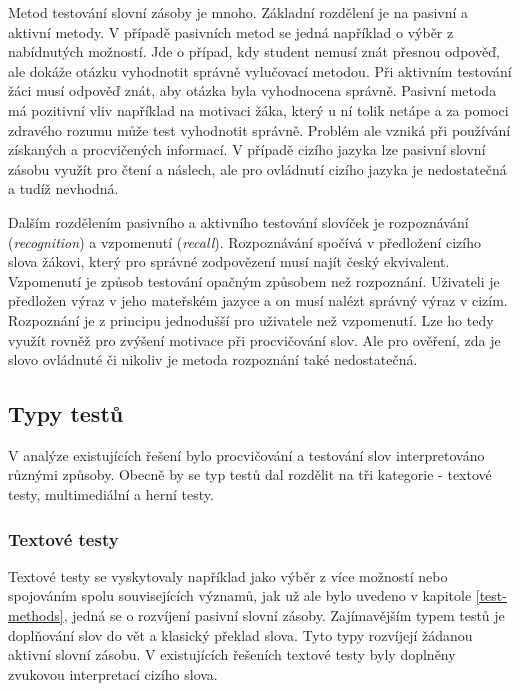 \documentclass[a4paper,11pt,titlepage,fleqn]{article}
\begin{document}
            Metod testování slovní zásoby je mnoho. Základní rozdělení je na pasivní a aktivní metody. V případě pasivních metod se jedná například o výběr z nabídnutých možností. Jde o případ, kdy student nemusí znát přesnou odpověď, ale dokáže otázku vyhodnotit správně vylučovací metodou. Při aktivním testování žáci musí odpověď znát, aby otázka byla vyhodnocena správně. Pasivní metoda má pozitivní vliv například na motivaci žáka, který u ní tolik netápe a za pomoci zdravého rozumu může test vyhodnotit správně. Problém ale vzniká při používání získaných a procvičených informací. V případě cizího jazyka lze pasivní slovní zásobu využít pro čtení a náslech, ale pro ovládnutí cizího jazyka je nedostatečná a tudíž nevhodná. 

            Dalším rozdělením pasivního a aktivního testování slovíček je rozpoznávání (\textit{recognition}) a vzpomenutí (\textit{recall}). Rozpoznávání spočívá v předložení cizího slova žákovi, který pro správné zodpovězení musí najít český ekvivalent. Vzpomenutí je způsob testování opačným způsobem než rozpoznání. Uživateli je předložen výraz v jeho mateřském jazyce a on musí nalézt správný výraz v cizím. Rozpoznání je z principu jednodušší pro uživatele než vzpomenutí. Lze ho tedy využít rovněž pro zvýšení motivace při procvičování slov. Ale pro ověření, zda je slovo ovládnuté či nikoliv je metoda rozpoznání také nedostatečná.

        \subsection{Typy testů}

            V analýze existujících řešení bylo procvičování a testování slov interpretováno různými způsoby. Obecně by se typ testů dal rozdělit na tři kategorie - textové testy, multimediální a herní testy.

            \subsubsection{Textové testy}
                Textové testy se vyskytovaly například jako výběr z více možností nebo spojováním spolu souvisejících významů, jak už ale bylo uvedeno v kapitole \ref{test-methods}, jedná se o rozvíjení pasivní slovní zásoby. Zajímavějším typem testů je doplňování slov do vět a klasický překlad slova. Tyto typy rozvíjejí žádanou aktivní slovní zásobu. V existujících řešeních textové testy byly doplněny zvukovou interpretací cizího slova.
\end{document}

